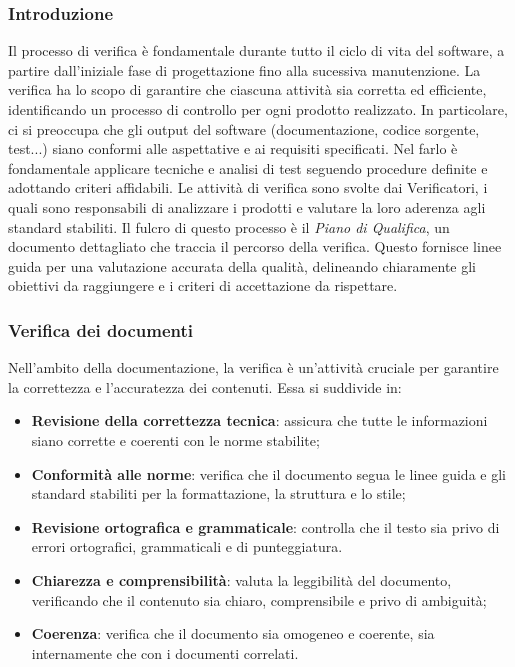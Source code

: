 \subsubsection{Introduzione}
Il processo di verifica è fondamentale durante tutto il ciclo di vita del software, a partire dall'iniziale fase
di progettazione fino alla sucessiva manutenzione. La verifica ha lo scopo di garantire che ciascuna attività
sia corretta ed efficiente, identificando un processo di controllo per ogni prodotto realizzato. In particolare, ci si preoccupa che gli output
del software (documentazione, codice sorgente, test...) siano conformi alle aspettative e ai requisiti specificati. Nel farlo è fondamentale
applicare tecniche e analisi di test seguendo procedure definite e adottando criteri affidabili.
Le attività di verifica sono svolte dai Verificatori, i quali sono responsabili di analizzare i prodotti e valutare la loro aderenza agli standard
stabiliti. Il fulcro di questo processo è il \textit{Piano di Qualifica}, un documento dettagliato che traccia il percorso della verifica.
Questo fornisce linee guida per una valutazione accurata della qualità, delineando chiaramente gli obiettivi da raggiungere e i criteri di
accettazione da rispettare.

\subsubsection{Verifica dei documenti} \label{verifica_dei_documenti}
Nell'ambito della documentazione, la verifica è un'attività cruciale per garantire la correttezza e l'accuratezza dei contenuti. Essa si suddivide in:
\begin{itemize}
	\item \textbf{Revisione della correttezza tecnica}: assicura che tutte le informazioni siano corrette e coerenti con le norme stabilite;
	\item \textbf{Conformità alle norme}: verifica che il documento segua le linee guida e gli standard
	      stabiliti per la formattazione, la struttura e lo stile;
	\item \textbf{Revisione ortografica e grammaticale}: controlla che il testo sia privo di errori ortografici, grammaticali e di punteggiatura.
	\item \textbf{Chiarezza e comprensibilità}: valuta la leggibilità del documento, verificando che il contenuto sia chiaro, comprensibile e privo di ambiguità;
	\item \textbf{Coerenza}: verifica che il documento sia omogeneo e coerente, sia internamente che con i documenti correlati.
\end{itemize}

